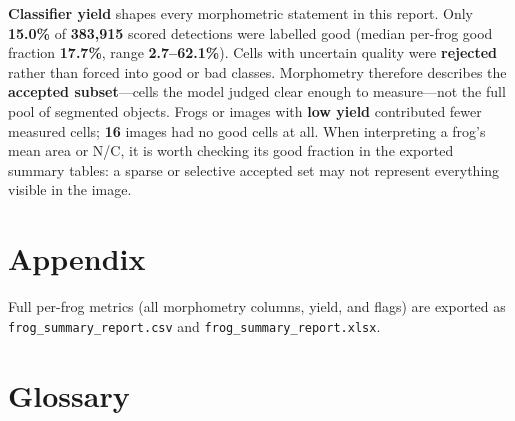 \documentclass[
  english,
]{article}
\begin{document}
\textbf{Classifier yield} shapes every morphometric statement in this
report. Only \textbf{15.0\%} of \textbf{383,915} scored detections were
labelled good (median per-frog good fraction \textbf{17.7\%}, range
\textbf{2.7--62.1\%}). Cells with uncertain quality were
\textbf{rejected} rather than forced into good or bad classes.
Morphometry therefore describes the \textbf{accepted subset}---cells the
model judged clear enough to measure---not the full pool of segmented
objects. Frogs or images with \textbf{low yield} contributed fewer
measured cells; \textbf{16} images had no good cells at all. When
interpreting a frog's mean area or N/C, it is worth checking its good
fraction in the exported summary tables: a sparse or selective accepted
set may not represent everything visible in the image.

\section{Appendix}\label{appendix}

Full per-frog metrics (all morphometry columns, yield, and flags) are
exported as \texttt{frog\_summary\_report.csv} and
\texttt{frog\_summary\_report.xlsx}.

\section{Glossary}\label{glossary}
\end{document}
